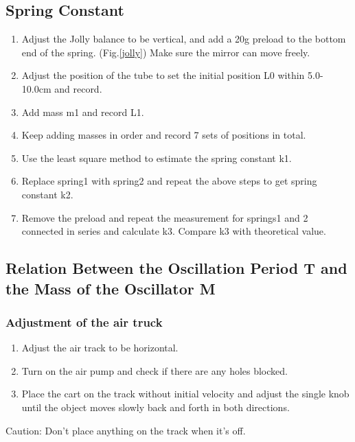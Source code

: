 \documentclass[12pt,a4paper]{article}
\begin{document}
\subsection{Spring Constant}
\begin{enumerate}[1.]
    \item Adjust the Jolly balance to be vertical, and add a 20g preload to the bottom end of the spring. (Fig.\ref{jolly}) Make sure the mirror can move freely.
    \item Adjust the position of the tube to set the initial position L0 within 5.0-10.0cm and record.
    \item Add mass m1 and record L1. 
    \item Keep adding masses in order and record 7 sets of positions in total. 
    \item Use the least square method to estimate the spring constant k1.
    \item Replace spring1 with spring2 and repeat the above steps to get spring constant k2.\item Remove the preload and repeat the measurement for springs1 and 2 connected in series and calculate k3. Compare k3 with theoretical value.
\end{enumerate}

\subsection{Relation Between the Oscillation Period T and the Mass of the Oscillator M}
\subsubsection{Adjustment of the air truck}
\begin{enumerate}[1.]
    \item Adjust the air track to be horizontal. 
    \item Turn on the air pump and check if there are any holes blocked.
    \item Place the cart on the track without initial velocity and adjust the single knob until the object moves slowly back and forth in both directions.
\end{enumerate}
Caution: Don’t place anything on the track when it’s off.
\end{document}
